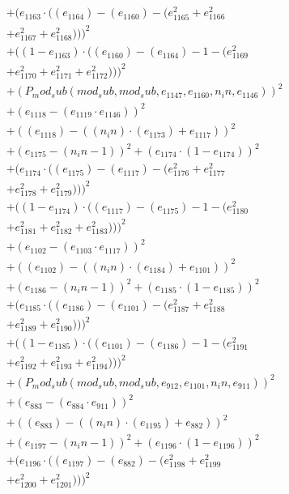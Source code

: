 \documentclass[10pt, a4paper]{article}
\begin{document}
\begin{align*}
& + (e_{1163}  \cdot  ((e_{1164}) - (e_{1160}) - (e_{1165}^{2} + e_{1166}^{2} \\
& + e_{1167}^{2} + e_{1168}^{2})))^{2} \\
& + ((1 - e_{1163})  \cdot  ((e_{1160}) - (e_{1164}) - 1 - (e_{1169}^{2} \\
& + e_{1170}^{2} + e_{1171}^{2} + e_{1172}^{2})))^{2} \\
& + (P_mod_sub(mod_sub, mod_sub, e_{1147}, e_{1160}, n_in, e_{1146}))^{2} \\
& + (e_{1118} - (e_{1119}  \cdot  e_{1146}))^{2} \\
& + ((e_{1118}) - ((n_in)  \cdot  (e_{1173}) + e_{1117}))^{2} \\
& + (e_{1175} - (n_in - 1))^{2} + (e_{1174}  \cdot  (1 - e_{1174}))^{2} \\
& + (e_{1174}  \cdot  ((e_{1175}) - (e_{1117}) - (e_{1176}^{2} + e_{1177}^{2} \\
& + e_{1178}^{2} + e_{1179}^{2})))^{2} \\
& + ((1 - e_{1174})  \cdot  ((e_{1117}) - (e_{1175}) - 1 - (e_{1180}^{2} \\
& + e_{1181}^{2} + e_{1182}^{2} + e_{1183}^{2})))^{2} \\
& + (e_{1102} - (e_{1103}  \cdot  e_{1117}))^{2} \\
& + ((e_{1102}) - ((n_in)  \cdot  (e_{1184}) + e_{1101}))^{2} \\
& + (e_{1186} - (n_in - 1))^{2} + (e_{1185}  \cdot  (1 - e_{1185}))^{2} \\
& + (e_{1185}  \cdot  ((e_{1186}) - (e_{1101}) - (e_{1187}^{2} + e_{1188}^{2} \\
& + e_{1189}^{2} + e_{1190}^{2})))^{2} \\
& + ((1 - e_{1185})  \cdot  ((e_{1101}) - (e_{1186}) - 1 - (e_{1191}^{2} \\
& + e_{1192}^{2} + e_{1193}^{2} + e_{1194}^{2})))^{2} \\
& + (P_mod_sub(mod_sub, mod_sub, e_{912}, e_{1101}, n_in, e_{911}))^{2} \\
& + (e_{883} - (e_{884}  \cdot  e_{911}))^{2} \\
& + ((e_{883}) - ((n_in)  \cdot  (e_{1195}) + e_{882}))^{2} \\
& + (e_{1197} - (n_in - 1))^{2} + (e_{1196}  \cdot  (1 - e_{1196}))^{2} \\
& + (e_{1196}  \cdot  ((e_{1197}) - (e_{882}) - (e_{1198}^{2} + e_{1199}^{2} \\
& + e_{1200}^{2} + e_{1201}^{2})))^{2} \\

\end{align*}
\end{document}
